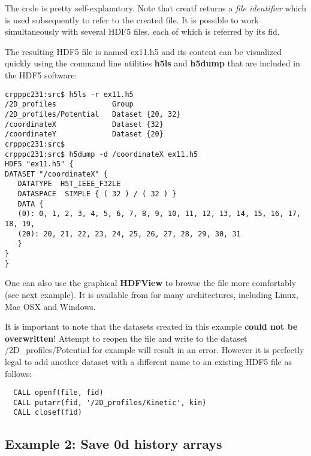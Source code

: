 \documentclass[a4paper]{article}
\begin{document}
The code is pretty self-explanatory. Note that {\ttfamily creatf} returns a
{\itshape file identifier\/} which is used subsequently to refer to the created
file. It is possible to work simultaneously with several HDF5 files, each of
which is referred by its {\ttfamily fid}.

The resulting HDF5 file is named
{\ttfamily ex11.h5} and its content can be visualized quickly using
the command line utilities
{\bfseries h5ls} and {\bfseries h5dump} that are included in the HDF5 software:
\begin{tscreen}
\begin{verbatim}
crpppc231:src$ h5ls -r ex11.h5
/2D_profiles             Group
/2D_profiles/Potential   Dataset {20, 32}
/coordinateX             Dataset {32}
/coordinateY             Dataset {20}
crpppc231:src$
crpppc231:src$ h5dump -d /coordinateX ex11.h5
HDF5 "ex11.h5" {
DATASET "/coordinateX" {
   DATATYPE  H5T_IEEE_F32LE
   DATASPACE  SIMPLE { ( 32 ) / ( 32 ) }
   DATA {
   (0): 0, 1, 2, 3, 4, 5, 6, 7, 8, 9, 10, 11, 12, 13, 14, 15, 16, 17, 18, 19,
   (20): 20, 21, 22, 23, 24, 25, 26, 27, 28, 29, 30, 31
   }
}
}
\end{verbatim}
\end{tscreen}

One can also use the graphical {\bfseries HDFView} to browse the file more
comfortably (see next example).
It is available from 
for many architectures, including Linux, Mac OSX and Windows.

It is important to note that the datasets created in this example {\bfseries could not
be overwritten}! Attempt to reopen the file and write to the dataset
{\ttfamily /2D\_profiles/Potential} for example will result in an error. However it
is perfectly legal to add another dataset with a different name to an existing
HDF5 file as follows:
\begin{tscreen}
\begin{verbatim}
  CALL openf(file, fid)
  CALL putarr(fid, '/2D_profiles/Kinetic', kin)
  CALL closef(fid)
\end{verbatim}
\end{tscreen}





\subsection{Example 2: Save 0d history arrays \label{0d_history}}
\end{document}
